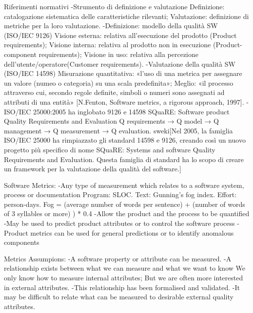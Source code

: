 \documentclass{report}
\begin{document}
Riferimenti normativi
-Strumento di definizione e valutazione
 Definizione: catalogazione sistematica delle caratteristiche rilevanti;
 Valutazione: definizione di metriche per la loro valutazione.
-Definizione: modello della qualità SW (ISO/IEC 9126)
 Visione esterna: relativa all’esecuzione del prodotto (Product requirements);
 Visione interna: relativa al prodotto non in esecuzione (Product-component requirements);
 Visione in uso: relativa alla percezione dell’utente/operatore(Customer requirements).
-Valutazione della qualità SW (ISO/IEC 14598)
 Misurazione quantitativa: «l’uso di una metrica per assegnare un valore (numeo o categoria) su una scala predefinita»;
 Meglio: «il processo attraverso cui, secondo regole definite, simboli o numeri sono assegnati ad attributi di una entità»
 [N.Fenton, Software metrics, a rigorous approach, 1997].
-ISO/IEC 25000:2005 ha inglobato 9126 e 14598
 SQuaRE: Software product Quality Requirements and Evaluation 
 Q requirements → Q model → Q management → Q measurement → Q evaluation.
sweki[Nel 2005, la famiglia ISO/IEC 25000 ha rimpiazzato gli standard 14598 e 9126, creando così un nuovo progetto più specifico di nome SQuaRE: Systems and software Quality Requirements and Evaluation. Questa famiglia di standard ha lo scopo di creare un framework per la valutazione della qualità del software.]

Software Metrics:
-Any type of measurement which relates to a software system, process or documentation
 Program: SLOC. Text: Gunning’s fog index. Effort: person-days.
 Fog = (average number of words per sentence) + (number of words of 3 syllables or more) ) * 0.4
-Allow the product and the process to be quantified
-May be used to predict product attributes or to control the software process
-Product metrics can be used for general predictions or to identify anomalous components

Metrics Assumpions:
-A software property or attribute can be measured.
-A relationship exists between what we can measure and what we want to know
 We only know how to measure internal attributes;
 But we are often more interested in external attributes.
-This relationship has been formalised and validated.
-It may be difficult to relate what can be measured to desirable external quality attributes.
\end{document}
